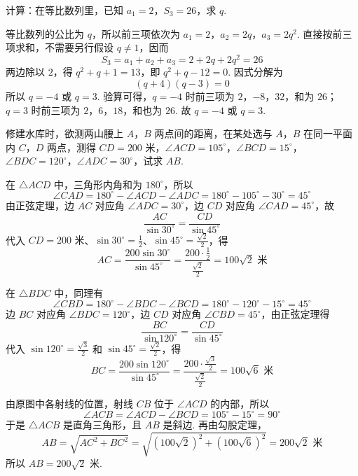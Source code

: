 \begin{problem}
计算：在等比数列里，已知 \(a_1=2\)，\(S_3=26\)，求 \(q\).
\end{problem}

\begin{solution}
等比数列的公比为 \(q\)，所以前三项依次为 \(a_1=2\)，\(a_2=2q\)，\(a_3=2q^2\). 直接按前三项求和，不需要另行假设 \(q\ne1\)，因而
\[
S_3=a_1+a_2+a_3=2+2q+2q^2=26
\]
两边除以 \(2\)，得 \(q^2+q+1=13\)，即 \(q^2+q-12=0\). 因式分解为
\[
\left(q+4\right)\left(q-3\right)=0
\]
所以 \(q=-4\) 或 \(q=3\). 验算可得，\(q=-4\) 时前三项为 \(2\)，\(-8\)，\(32\)，和为 \(26\)；\(q=3\) 时前三项为 \(2\)，\(6\)，\(18\)，和也为 \(26\). 故 \(q=-4\) 或 \(q=3\).
\end{solution}

\begin{problem}
修建水库时，欲测两山腰上 \(A\)，\(B\) 两点间的距离，在某处选与 \(A\)，\(B\) 在同一平面内 \(C\)，\(D\) 两点，测得 \(CD=200\text{ 米}\)，\(\angle ACD=105^\circ\)，\(\angle BCD=15^\circ\)，\(\angle BDC=120^\circ\)，\(\angle ADC=30^\circ\)，试求 \(AB\).
\end{problem}

\begin{solution}

在 \(\triangle ACD\) 中，三角形内角和为 \(180^\circ\)，所以
\[
\angle CAD=180^\circ-\angle ACD-\angle ADC=180^\circ-105^\circ-30^\circ=45^\circ
\]
由正弦定理，边 \(AC\) 对应角 \(\angle ADC=30^\circ\)，边 \(CD\) 对应角 \(\angle CAD=45^\circ\)，故
\[
\frac{AC}{\sin30^\circ}=\frac{CD}{\sin45^\circ}
\]
代入 \(CD=200\text{ 米}\)、\(\sin30^\circ=\frac12\)、\(\sin45^\circ=\frac{\sqrt2}{2}\)，得
\[
AC=\frac{200\sin30^\circ}{\sin45^\circ}=\frac{200\cdot\frac12}{\frac{\sqrt2}{2}}=100\sqrt2\text{ 米}
\]

在 \(\triangle BDC\) 中，同理有
\[
\angle CBD=180^\circ-\angle BDC-\angle BCD=180^\circ-120^\circ-15^\circ=45^\circ
\]
边 \(BC\) 对应角 \(\angle BDC=120^\circ\)，边 \(CD\) 对应角 \(\angle CBD=45^\circ\)，由正弦定理得
\[
\frac{BC}{\sin120^\circ}=\frac{CD}{\sin45^\circ}
\]
代入 \(\sin120^\circ=\frac{\sqrt3}{2}\) 和 \(\sin45^\circ=\frac{\sqrt2}{2}\)，得
\[
BC=\frac{200\sin120^\circ}{\sin45^\circ}=\frac{200\cdot\frac{\sqrt3}{2}}{\frac{\sqrt2}{2}}=100\sqrt6\text{ 米}
\]

由原图中各射线的位置，射线 \(CB\) 位于 \(\angle ACD\) 的内部，所以
\[
\angle ACB=\angle ACD-\angle BCD=105^\circ-15^\circ=90^\circ
\]
于是 \(\triangle ACB\) 是直角三角形，且 \(AB\) 是斜边. 再由勾股定理，
\[
AB=\sqrt{AC^2+BC^2}=\sqrt{\left(100\sqrt{2}\right)^2+\left(100\sqrt{6}\right)^2}=200\sqrt{2}\text{ 米}
\]
所以 \(AB=200\sqrt{2}\text{ 米}\).
\end{solution}


